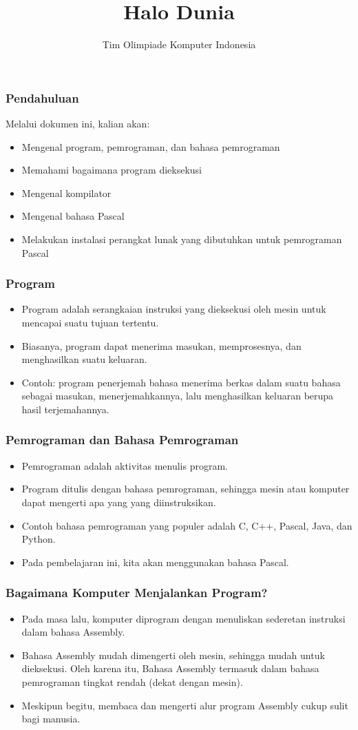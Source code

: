 \documentclass{beamer}
\title{Halo Dunia}
\author{Tim Olimpiade Komputer Indonesia}
\begin{document}
\begin{frame}
\titlepage
\end{frame}

\begin{frame}
\frametitle{Pendahuluan}
Melalui dokumen ini, kalian akan:
\begin{itemize}
	\item Mengenal program, pemrograman, dan bahasa pemrograman
	\item Memahami bagaimana program dieksekusi
	\item Mengenal kompilator
	\item Mengenal bahasa Pascal
	\item Melakukan instalasi perangkat lunak yang dibutuhkan untuk pemrograman Pascal
\end{itemize}
\end{frame}

\begin{frame}
\frametitle{Program}
\begin{itemize}
	\item Program adalah serangkaian instruksi yang dieksekusi oleh mesin untuk mencapai suatu tujuan tertentu.
	\item Biasanya, program dapat menerima masukan, memprosesnya, dan menghasilkan suatu keluaran.
	\item Contoh: program penerjemah bahasa menerima berkas dalam suatu bahasa sebagai masukan, menerjemahkannya, lalu menghasilkan keluaran berupa hasil terjemahannya.
\end{itemize}
\end{frame}

\begin{frame}
\frametitle{Pemrograman dan Bahasa Pemrograman}
\begin{itemize}
	\item Pemrograman adalah aktivitas menulis program.
	\item Program ditulis dengan bahasa pemrograman, sehingga mesin atau komputer dapat mengerti apa yang yang diinstruksikan.
	\item Contoh bahasa pemrograman yang populer adalah C, C++, Pascal, Java, dan Python. 
	\item Pada pembelajaran ini, kita akan menggunakan bahasa Pascal.
\end{itemize}
\end{frame}

\begin{frame}
\frametitle{Bagaimana Komputer Menjalankan Program?}
\begin{itemize}
	\item Pada masa lalu, komputer diprogram dengan menuliskan sederetan instruksi dalam bahasa Assembly.
	\item Bahasa Assembly mudah dimengerti oleh mesin, sehingga mudah untuk dieksekusi. Oleh karena itu, Bahasa Assembly termasuk dalam bahasa pemrograman tingkat rendah (dekat dengan mesin).
	\item Meskipun begitu, membaca dan mengerti alur program Assembly cukup sulit bagi manusia.
\end{itemize}
\end{frame}
\end{document}

